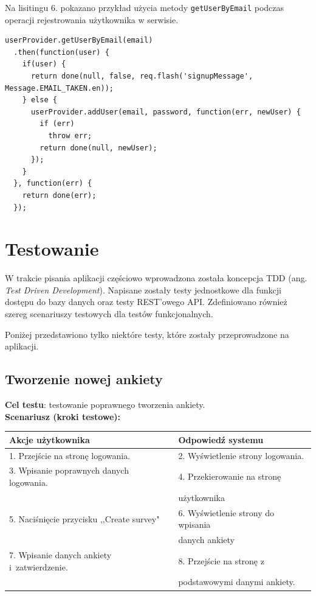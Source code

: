 \documentclass[8pt,a4paper,notitlepage]{article}
\begin{document}
\par Na lisitingu 6. pokazano przykład użycia metody \texttt{getUserByEmail} podczas operacji rejestrowania użytkownika w serwisie.

\newpage
\begin{lstlisting}[caption=Przykład użycia metody \texttt{getUserByEmail} ]
userProvider.getUserByEmail(email)
  .then(function(user) {
    if(user) {
      return done(null, false, req.flash('signupMessage', Message.EMAIL_TAKEN.en));
    } else {
      userProvider.addUser(email, password, function(err, newUser) {
        if (err)
          throw err;
        return done(null, newUser);
      });
    }
  }, function(err) {
    return done(err);
  });
\end{lstlisting}

\newpage
\section{Testowanie}
W trakcie pisania aplikacji częściowo wprowadzona została koncepcja TDD (ang. \textit{Test Driven Development}). Napisane zostały testy jednostkowe dla funkcji dostępu do bazy danych oraz testy REST'owego API. Zdefiniowano również szereg scenariuszy testowych dla testów funkcjonalnych.
\par Poniżej przedstawiono tylko niektóre testy, które zostały przeprowadzone na aplikacji.

\subsection{Tworzenie nowej ankiety}
\textbf{Cel testu}: testowanie poprawnego tworzenia ankiety. \\
\textbf{Scenariusz (kroki testowe):}
\begin{center}

  \begin{tabular}{| l| l|}
    \hline
    
 \textbf{Akcje użytkownika} &  \textbf{Odpowiedź systemu} \\  \hline
1. Przejście na stronę logowania. & 2. Wyświetlenie strony logowania. \\ 
3. Wpisanie poprawnych danych logowania. & 4. Przekierowanie na stronę  \\ 
& użytkownika \\ 
5. Naciśnięcie przycisku ,,Create survey" & 6. Wyświetlenie strony do wpisania \\ & danych ankiety \\
7. Wpisanie danych ankiety i~zatwierdzenie. & 8. Przejście na stronę z~ \\ &  podstawowymi danymi ankiety. \\
\hline
 
  \end{tabular}
\end{center}
\end{document}
